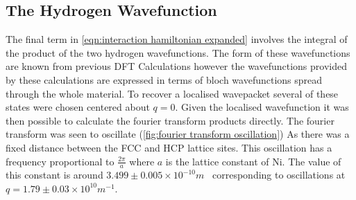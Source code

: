 \subsection{The Hydrogen Wavefunction}
The final term in
\cref{eqn:interaction hamiltonian expanded}
involves the integral
of the product of the two
hydrogen wavefunctions.
The form of these wavefunctions
are known from
previous DFT Calculations\cite{Jianding-Zhu}
however the wavefunctions provided
by these calculations
are expressed in terms of bloch wavefunctions spread
through the whole material.
To recover a localised
wavepacket several of these states were chosen
centered about \(q=0\).
Given the localised wavefunction
it was then possible to calculate the fourier
transform products directly. The fourier transform was seen to
oscillate (\cref{fig:fourier transform oscillation})
As there was a fixed
distance between the FCC and HCP lattice
sites.
This oscillation has a frequency proportional to
\(\frac{2\pi}{a}\) where \(a\) is the lattice
constant of Ni. The value of this constant
is around
\(3.499\pm{}0.005\times{}10^{-10}m\)~\cite{PhysRev.25.753}
corresponding to oscillations at
\(q = 1.79 \pm 0.03 \times{}10^{10}m^{-1}\).
